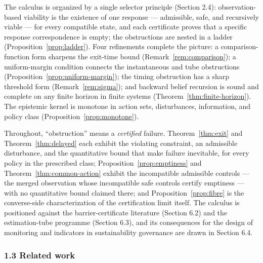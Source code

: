 \documentclass[11pt]{article}
\theoremstyle{definition}
\begin{document}
The calculus is organized by a single selector principle (Section 2.4):
observation-based viability is the existence of one response ---
admissible, safe, and recursively viable --- for every compatible state,
and each certificate proves that a specific response correspondence is
empty; the obstructions are nested in a ladder
(Proposition~\ref{prop:ladder}). Four refinements complete the picture:
a comparison-function form sharpens the exit-time bound
(Remark~\ref{rem:comparison}); a uniform-margin condition connects the
instantaneous and tube obstructions
(Proposition~\ref{prop:uniform-margin}); the timing obstruction has a
sharp threshold form (Remark~\ref{rem:sigma}); and backward belief
recursion is sound and complete on any finite horizon in finite systems
(Theorem~\ref{thm:finite-horizon}). The epistemic kernel is monotone in
action sets, disturbances, information, and policy class
(Proposition~\ref{prop:monotone}).

Throughout, ``obstruction'' means a \emph{certified} failure. Theorem~\ref{thm:exit} and Theorem~\ref{thm:delayed} each exhibit the violating constraint, an admissible disturbance,
and the quantitative bound that make failure inevitable, for every policy in the prescribed class; Proposition~\ref{prop:emptiness} and Theorem~\ref{thm:common-action} exhibit the incompatible
admissible controls --- the merged observation whose incompatible safe
controls certify emptiness --- with no quantitative bound claimed there;
and Proposition~\ref{prop:fibre} is the converse-side characterization of the certification
limit itself. The calculus is positioned against
the barrier-certificate literature (Section 6.2) and the estimation-tube
programme (Section 6.3), and its consequences for the design of
monitoring and indicators in sustainability governance are drawn in
Section 6.4.

\subsubsection{1.3 Related work}\label{related-work}
\end{document}
